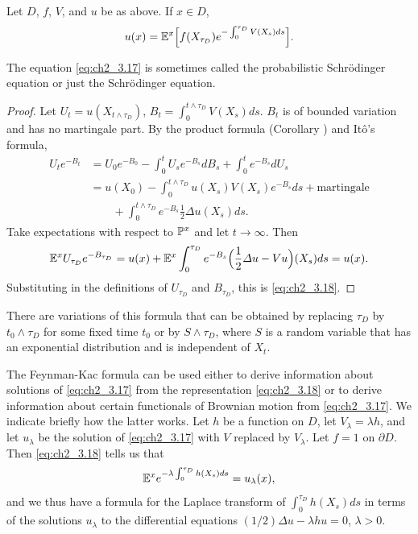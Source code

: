 \begin{theorem}\label{thm:ch2_3.7}
Let $D$, $f$, $V$, and $u$ be as above. If $x \in D$,
\begin{equation}\label{eq:ch2_3.18}
    u(x) = \E^x\Big[f(X_{\tau_D})e^{-\int_0^{\tau_D} V(X_s)ds}\Big].
\end{equation}
\end{theorem}

The equation \eqref{eq:ch2_3.17} is sometimes called the probabilistic Schr\"odinger equation or just the Schr\"odinger equation.

\begin{proof}
Let $U_t = u(X_{t\wedge\tau_D})$, $B_t = \int_0^{t\wedge\tau_D} V(X_s)ds$. $B_t$ is of bounded variation and has no martingale part. By the product formula (Corollary ) and It\^o's formula,
\begin{align*}
    U_te^{-B_t} &= U_0e^{-B_0} - \int_0^t U_se^{-B_s}dB_s + \int_0^t e^{-B_s}dU_s \\
    &= u(X_0) - \int_0^{t\wedge\tau_D} u(X_s)V(X_s)e^{-B_s}ds + \text{martingale} \\
    &\qquad+ \int_0^{t\wedge\tau_D} e^{-B_s}\frac{1}{2}\Delta u(X_s)ds.
\end{align*}
Take expectations with respect to $\P^x$ and let $t \to \infty$. Then
\[
    \E^x U_{\tau_D}e^{-B_{\tau_D}} = u(x) + \E^x\int_0^{\tau_D} e^{-B_s}\Big(\frac{1}{2}\Delta u - Vu\Big)(X_s)ds = u(x).
\]
Substituting in the definitions of $U_{\tau_D}$ and $B_{\tau_D}$, this is \eqref{eq:ch2_3.18}.
\end{proof}

There are variations of this formula that can be obtained by replacing $\tau_D$ by $t_0 \wedge \tau_D$ for some fixed time $t_0$ or by $S \wedge \tau_D$, where $S$ is a random variable that has an exponential distribution and is independent of $X_t$.

The Feynman-Kac formula can be used either to derive information about solutions of \eqref{eq:ch2_3.17} from the representation \eqref{eq:ch2_3.18} or to derive information about certain functionals of Brownian motion from \eqref{eq:ch2_3.17}. We indicate briefly how the latter works. Let $h$ be a function on $D$, let $V_\lambda = \lambda h$, and let $u_\lambda$ be the solution of \eqref{eq:ch2_3.17} with $V$ replaced by $V_\lambda$. Let $f = 1$ on $\partial D$. Then \eqref{eq:ch2_3.18} tells us that
\[
    \E^xe^{-\lambda\int_0^{\tau_D} h(X_s)ds} = u_\lambda(x),
\]
and we thus have a formula for the Laplace transform of $\int_0^{\tau_D} h(X_s)ds$ in terms of the solutions $u_\lambda$ to the differential equations $(1/2)\Delta u - \lambda hu = 0$, $\lambda > 0$.

